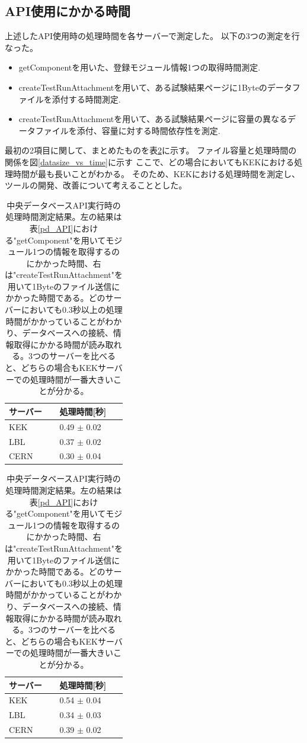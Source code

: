 \subsection{API使用にかかる時間}
上述したAPI使用時の処理時間を各サーバーで測定した。
以下の3つの測定を行なった。
\begin{itemize}
  \item getComponentを用いた、登録モジュール情報1つの取得時間測定.
  \item createTestRunAttachmentを用いて、ある試験結果ページに1Byteのデータファイルを添付する時間測定.
  \item createTestRunAttachmentを用いて、ある試験結果ページに容量の異なるデータファイルを添付、容量に対する時間依存性を測定.
\end{itemize}

最初の2項目に関して、まとめたものを表\ref{use_prodDB_API}に示す。
ファイル容量と処理時間の関係を図\ref{datasize_vs_time}に示す
ここで、どの場合においてもKEKにおける処理時間が最も長いことがわかる。
そのため、KEKにおける処理時間を測定し、ツールの開発、改善について考えることとした。

\begin{table}[tbp]
  \caption[中央データベースAPI実行時の処理時間測定結果。]{中央データベースAPI実行時の処理時間測定結果。左の結果は表\ref{pd_API}における"getComponent"を用いてモジュール1つの情報を取得するのにかかった時間、右は"createTestRunAttachment"を用いて1Byteのファイル送信にかかった時間である。どのサーバーにおいても0.3秒以上の処理時間がかかっていることがわかり、データベースへの接続、情報取得にかかる時間が読み取れる。3つのサーバーを比べると、どちらの場合もKEKサーバーでの処理時間が一番大きいことが分かる。}
  \label{use_prodDB_API}
  \begin{minipage}[t]{.45\textwidth}
  \begin{center}
    \begin{tabular}{|ll|} \hline
      サーバー & 処理時間[秒] \\ \hline
      KEK & 0.49 $\pm$ 0.02 \\ 
      LBL & 0.37 $\pm$ 0.02 \\ 
      CERN & 0.30 $\pm$ 0.04 \\ \hline 
    \end{tabular}
  \end{center}
  \end{minipage}
  \hfill 
  \begin{minipage}[t]{.45\textwidth}
  \begin{center}
    \begin{tabular}{|ll|} \hline
      サーバー & 処理時間[秒] \\ \hline
      KEK & 0.54 $\pm$ 0.04 \\ 
      LBL & 0.34 $\pm$ 0.03 \\ 
      CERN & 0.39 $\pm$ 0.02 \\ \hline 
    \end{tabular}
  \end{center}
  \end{minipage}
\end{table}

